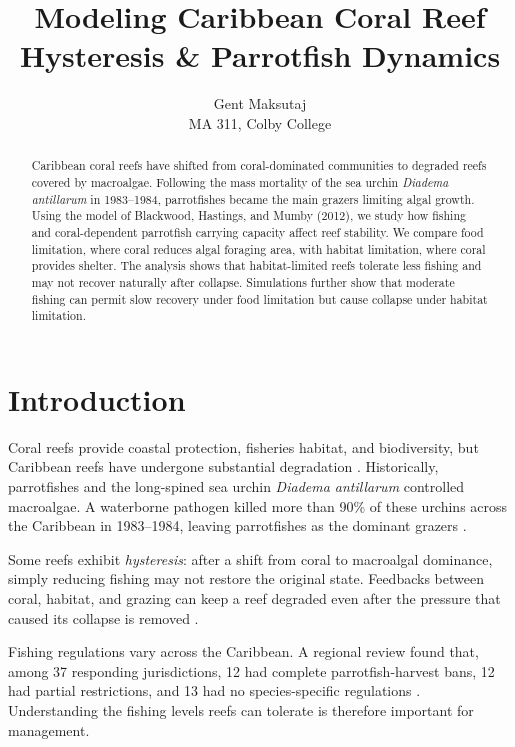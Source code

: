 \documentclass[10pt,a4paper]{article}
\title{Modeling Caribbean Coral Reef Hysteresis \& Parrotfish Dynamics}
\author{Gent Maksutaj\\
\small MA 311, Colby College}
\date{}
\begin{document}
\maketitle

\begin{abstract}
Caribbean coral reefs have shifted from coral-dominated communities to degraded reefs covered by macroalgae. Following the mass mortality of the sea urchin \textit{Diadema antillarum} in 1983--1984, parrotfishes became the main grazers limiting algal growth. Using the model of Blackwood, Hastings, and Mumby (2012), we study how fishing and coral-dependent parrotfish carrying capacity affect reef stability. We compare food limitation, where coral reduces algal foraging area, with habitat limitation, where coral provides shelter. The analysis shows that habitat-limited reefs tolerate less fishing and may not recover naturally after collapse. Simulations further show that moderate fishing can permit slow recovery under food limitation but cause collapse under habitat limitation.
\end{abstract}

\section{Introduction}

Coral reefs provide coastal protection, fisheries habitat, and biodiversity, but Caribbean reefs have undergone substantial degradation \cite{hughes1994,jackson2014}. Historically, parrotfishes and the long-spined sea urchin \textit{Diadema antillarum} controlled macroalgae. A waterborne pathogen killed more than 90\% of these urchins across the Caribbean in 1983--1984, leaving parrotfishes as the dominant grazers \cite{hughes1994,bellwood2004,mumby2007}.

Some reefs exhibit \textit{hysteresis}: after a shift from coral to macroalgal dominance, simply reducing fishing may not restore the original state. Feedbacks between coral, habitat, and grazing can keep a reef degraded even after the pressure that caused its collapse is removed \cite{mumby2007,blackwood2012}.

Fishing regulations vary across the Caribbean. A regional review found that, among 37 responding jurisdictions, 12 had complete parrotfish-harvest bans, 12 had partial restrictions, and 13 had no species-specific regulations \cite{harmstuohy2021}. Understanding the fishing levels reefs can tolerate is therefore important for management.
\end{document}
